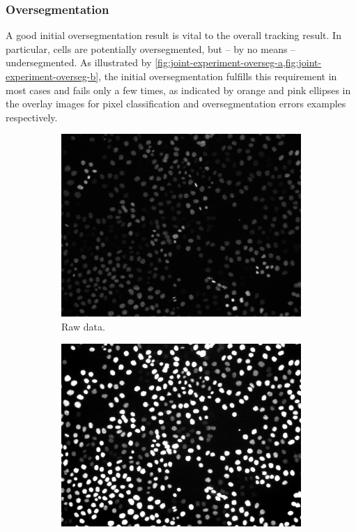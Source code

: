 \subsubsection{Oversegmentation}
\label{subsubsec:joint-experiment-oversegmentation}
A good initial oversegmentation result is vital to the overall tracking result. In particular, cells
are potentially oversegmented, but -- by no means -- undersegmented. As illustrated by
\cref{fig:joint-experiment-overseg-a,fig:joint-experiment-overseg-b}, the initial oversegmentation
fulfills this requirement in most cases and fails only a few times, as indicated by orange and pink
ellipses in the overlay images for pixel classification and oversegmentation errors examples
respectively.
\begin{figure}
    \begin{subfigure}[t]{0.48\textwidth}
        \includegraphics[width=\textwidth]{images/joint/overseg/75/raw.png}
        \caption{Raw data.}
    \end{subfigure}
    \hfill
    \begin{subfigure}[t]{0.48\textwidth}
        \includegraphics[width=\textwidth]{images/joint/overseg/75/raw_high_contrast.png}

\end{subfigure}
\end{figure}

